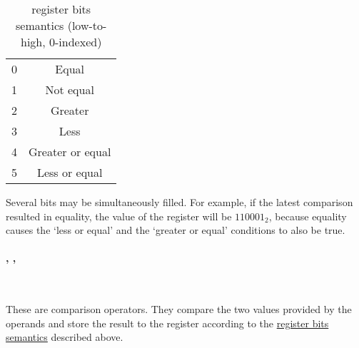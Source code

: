 \hypertarget{flags:bits}{}
{
    \vspace{-0.4cm}
    \renewcommand{\arraystretch}{1.4}
    \begin{table}[h!]
        \centering
        \caption{ register bits semantics (low-to-high, 0-indexed)}
        \vspace{2mm}
        \begin{tabular}{| c | c |}
            \hline
            0 & Equal            \\
            1 & Not equal        \\
            2 & Greater          \\
            3 & Less             \\
            4 & Greater or equal \\
            5 & Less or equal    \\
            \hline
        \end{tabular}
    \end{table}
}

Several bits may be simultaneously filled.
For example, if the latest comparison resulted in equality,
the value of the  register will be $110001_2$, because equality
causes the `less or equal' and the `greater or equal' conditions
to also be true.

\vspace{-0.35cm}
\paragraph{, , }\

These are comparison operators.
They compare the two values provided by the operands and store the result to
the  register according to the \hyperlink{flags:bits}{
register bits semantics} described above.

